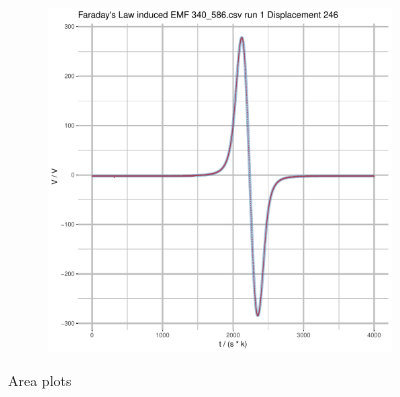 \documentclass[a4paper,11pt]{article}
\begin{document}
\begin{figure}[b]
\begin{subfigure}{.5\textwidth}
\end{subfigure}
\begin{subfigure}{.7\textwidth}
    \centering
    \includegraphics[width=\textwidth,page=20]{Rplots.pdf}
\end{subfigure}
\caption{Area plots}
\end{figure}
\end{document}
